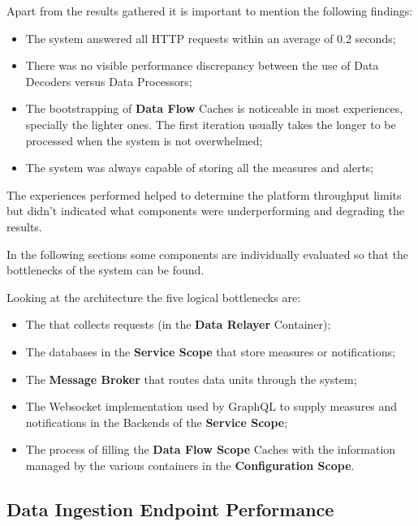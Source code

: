 Apart from the results gathered it is important to mention the following findings:

\begin{itemize}
    \item The system answered all HTTP requests within an average of 0.2 seconds;
    \item There was no visible performance discrepancy between the use of Data Decoders versus Data Processors;
    \item The bootstrapping of \textbf{Data Flow} Caches is noticeable in most experiences, specially the lighter ones. The first iteration usually takes the longer to be processed when the system is not overwhelmed;
    \item The system was always capable of storing all the measures and alerts;
\end{itemize}

The experiences performed helped to determine the platform throughput limits but didn't indicated what components were underperforming and degrading the results.

In the following sections some components are individually evaluated so that the bottlenecks of the system can be found. 

Looking at the architecture the five logical bottlenecks are:

\begin{itemize}
    \item The  that collects requests (in the \textbf{Data Relayer} Container);
    \item The databases in the \textbf{Service Scope} that store measures or notifications;
    \item The \textbf{Message Broker} that routes data units through the system;
    \item The Websocket implementation used by GraphQL to supply measures and notifications in the Backends of the \textbf{Service Scope};
    \item The process of filling the \textbf{Data Flow Scope} Caches with the information managed by the various containers in the \textbf{Configuration Scope}.
\end{itemize}

\subsection{Data Ingestion Endpoint Performance}
\label{subsec:evaluation:overview:endpoint}


